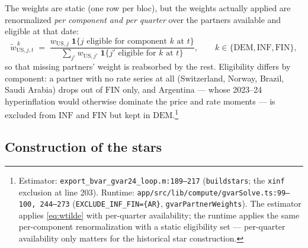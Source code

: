 \documentclass[11pt]{article}
\newcommand{\code}[1]{\texttt{\small #1}}
\begin{document}
The weights are static (one row per bloc), but the weights actually applied are renormalized
\emph{per component and per quarter} over the partners available and eligible at that date:
\begin{equation}\label{eq:wtilde}
  \tilde w^{\,k}_{\mathrm{US},j,t}
  \;=\;
  \frac{w_{\mathrm{US},j}\;\mathbf{1}\{j \text{ eligible for component } k \text{ at } t\}}
       {\sum_{j'} w_{\mathrm{US},j'}\;\mathbf{1}\{j' \text{ eligible for } k \text{ at } t\}},
  \qquad k \in \{\mathrm{DEM}, \mathrm{INF}, \mathrm{FIN}\},
\end{equation}
so that missing partners' weight is reabsorbed by the rest. Eligibility differs by component:
a partner with no rate series at all (Switzerland, Norway, Brazil, Saudi Arabia) drops out of
$\mathrm{FIN}$ only, and Argentina --- whose 2023--24 hyperinflation would otherwise dominate the
price and rate moments --- is excluded from $\mathrm{INF}$ and $\mathrm{FIN}$ but kept in
$\mathrm{DEM}$.\footnote{Estimator:
\code{export\_bvar\_gvar24\_loop.m:189--217} (\code{buildstars}; the \code{xinf} exclusion at line
203). Runtime: \code{app/src/lib/compute/gvarSolve.ts:99--100, 244--273}
(\code{EXCLUDE\_INF\_FIN=\{AR\}}, \code{gvarPartnerWeights}). The estimator applies
\eqref{eq:wtilde} with per-quarter availability; the runtime applies the same per-component
renormalization with a static eligibility set --- per-quarter availability only matters for the
historical star construction.}

\subsection{Construction of the stars}
\end{document}

